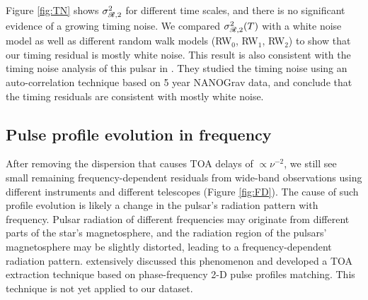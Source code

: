 {%
Figure \ref{fig:TN} shows $\sigma^2_{\mathscr{R},2}$ for different time scales, and
there is no significant evidence of a growing timing noise. We compared 
$\sigma^2_{\mathscr{R},2}(T)$ with a white noise model as well as different random
walk models (RW$_0$, RW$_1$, RW$_2$) to show that our timing residual is
mostly white noise.
This result is also consistent with the timing noise analysis of this pulsar in 
\citet{pjl+13}. They studied the timing noise using an auto-correlation technique
based on 5 year NANOGrav data, and conclude that the timing residuals are
consistent with mostly white noise.
}



\subsection{Pulse profile evolution in frequency}
\label{sec:FD}
After removing the dispersion that causes TOA delays of $\propto \nu^{-2}$,
 we still see small remaining frequency-dependent residuals from wide-band
observations using
different instruments and different telescopes (Figure \ref{fig:FD}).  
The cause of such profile evolution is likely a change in the pulsar's
radiation pattern with frequency.  Pulsar radiation of different frequencies may originate from
different parts of the star's magnetosphere, and 
the radiation region of the pulsars' magnetosphere may be slightly distorted,
leading to a frequency-dependent radiation pattern. \citet{pdr14} 
extensively discussed this phenomenon and developed a TOA extraction technique
based on phase-frequency 2-D pulse profiles matching. This technique is not
yet applied to our dataset.

